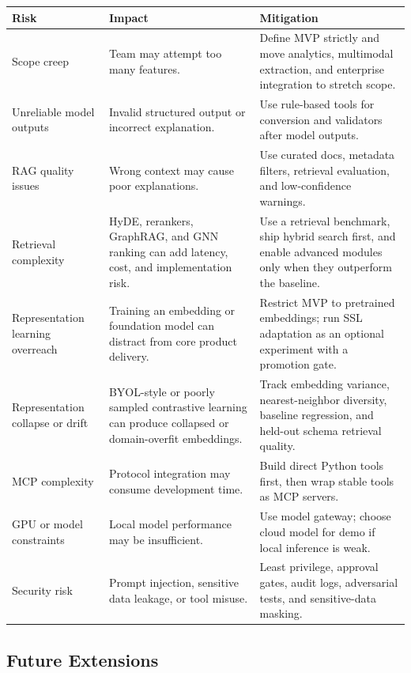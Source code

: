 \begin{tabularx}{\textwidth}{p{}p{}X}
\toprule
\textbf{Risk} & \textbf{Impact} & \textbf{Mitigation} \\
\midrule
Scope creep & Team may attempt too many features. & Define MVP strictly and move analytics, multimodal extraction, and enterprise integration to stretch scope. \\
Unreliable model outputs & Invalid structured output or incorrect explanation. & Use rule-based tools for conversion and validators after model outputs. \\
RAG quality issues & Wrong context may cause poor explanations. & Use curated docs, metadata filters, retrieval evaluation, and low-confidence warnings. \\
Retrieval complexity & HyDE, rerankers, GraphRAG, and GNN ranking can add latency, cost, and implementation risk. & Use a retrieval benchmark, ship hybrid search first, and enable advanced modules only when they outperform the baseline. \\
Representation learning overreach & Training an embedding or foundation model can distract from core product delivery. & Restrict MVP to pretrained embeddings; run SSL adaptation as an optional experiment with a promotion gate. \\
Representation collapse or drift & BYOL-style or poorly sampled contrastive learning can produce collapsed or domain-overfit embeddings. & Track embedding variance, nearest-neighbor diversity, baseline regression, and held-out schema retrieval quality. \\
MCP complexity & Protocol integration may consume development time. & Build direct Python tools first, then wrap stable tools as MCP servers. \\
GPU or model constraints & Local model performance may be insufficient. & Use model gateway; choose cloud model for demo if local inference is weak. \\
Security risk & Prompt injection, sensitive data leakage, or tool misuse. & Least privilege, approval gates, audit logs, adversarial tests, and sensitive-data masking. \\
\bottomrule
\end{tabularx}

\subsection{Future Extensions}

